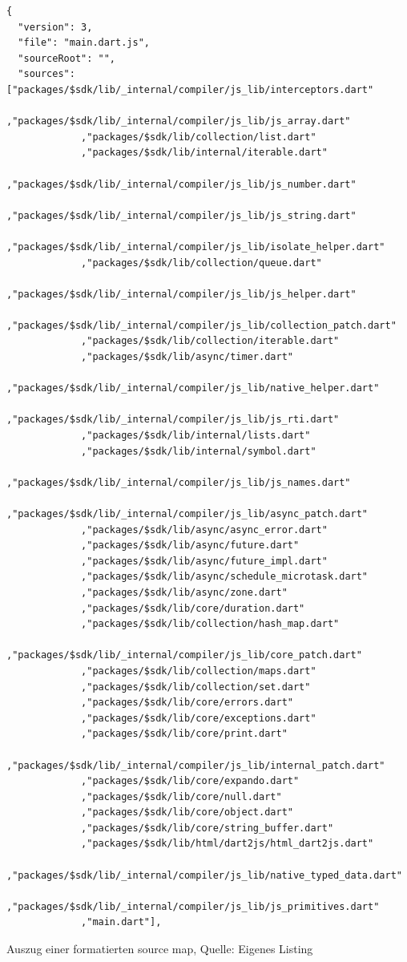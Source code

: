\begin{appendix}
\ifIncludeFigures\begin{listing}[htbp]
\begin{verbatim}
{
  "version": 3,
  "file": "main.dart.js",
  "sourceRoot": "",
  "sources": ["packages/$sdk/lib/_internal/compiler/js_lib/interceptors.dart" 
             ,"packages/$sdk/lib/_internal/compiler/js_lib/js_array.dart" 
             ,"packages/$sdk/lib/collection/list.dart" 
             ,"packages/$sdk/lib/internal/iterable.dart" 
             ,"packages/$sdk/lib/_internal/compiler/js_lib/js_number.dart" 
             ,"packages/$sdk/lib/_internal/compiler/js_lib/js_string.dart" 
             ,"packages/$sdk/lib/_internal/compiler/js_lib/isolate_helper.dart" 
             ,"packages/$sdk/lib/collection/queue.dart" 
             ,"packages/$sdk/lib/_internal/compiler/js_lib/js_helper.dart" 
             ,"packages/$sdk/lib/_internal/compiler/js_lib/collection_patch.dart" 
             ,"packages/$sdk/lib/collection/iterable.dart" 
             ,"packages/$sdk/lib/async/timer.dart" 
             ,"packages/$sdk/lib/_internal/compiler/js_lib/native_helper.dart" 
             ,"packages/$sdk/lib/_internal/compiler/js_lib/js_rti.dart" 
             ,"packages/$sdk/lib/internal/lists.dart" 
             ,"packages/$sdk/lib/internal/symbol.dart" 
             ,"packages/$sdk/lib/_internal/compiler/js_lib/js_names.dart" 
             ,"packages/$sdk/lib/_internal/compiler/js_lib/async_patch.dart" 
             ,"packages/$sdk/lib/async/async_error.dart" 
             ,"packages/$sdk/lib/async/future.dart" 
             ,"packages/$sdk/lib/async/future_impl.dart" 
             ,"packages/$sdk/lib/async/schedule_microtask.dart" 
             ,"packages/$sdk/lib/async/zone.dart" 
             ,"packages/$sdk/lib/core/duration.dart" 
             ,"packages/$sdk/lib/collection/hash_map.dart" 
             ,"packages/$sdk/lib/_internal/compiler/js_lib/core_patch.dart" 
             ,"packages/$sdk/lib/collection/maps.dart" 
             ,"packages/$sdk/lib/collection/set.dart" 
             ,"packages/$sdk/lib/core/errors.dart" 
             ,"packages/$sdk/lib/core/exceptions.dart" 
             ,"packages/$sdk/lib/core/print.dart" 
             ,"packages/$sdk/lib/_internal/compiler/js_lib/internal_patch.dart" 
             ,"packages/$sdk/lib/core/expando.dart" 
             ,"packages/$sdk/lib/core/null.dart" 
             ,"packages/$sdk/lib/core/object.dart" 
             ,"packages/$sdk/lib/core/string_buffer.dart" 
             ,"packages/$sdk/lib/html/dart2js/html_dart2js.dart" 
             ,"packages/$sdk/lib/_internal/compiler/js_lib/native_typed_data.dart" 
             ,"packages/$sdk/lib/_internal/compiler/js_lib/js_primitives.dart" 
             ,"main.dart"],
\end{verbatim}
\caption[Auszug einer formatierten source map]{Auszug einer formatierten source map, Quelle: Eigenes Listing}
\label{lst:AuszugEinerFormatiertenSourceMap}
\end{listing}\fi



\end{appendix}
